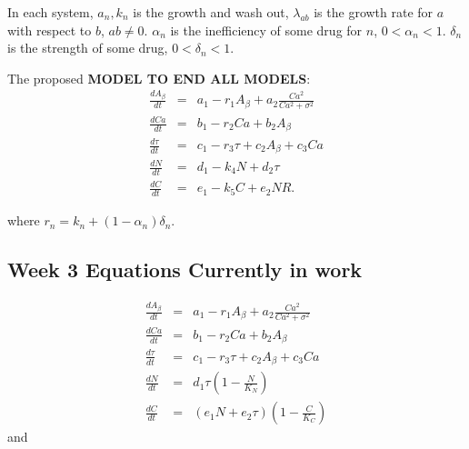 In each system, $a _{n},k _{n}$ is the growth and wash out, $\lambda _{ab}$ is the growth rate for $a$ with respect to $b$, $ab \neq 0$. 
$\alpha _{n}$ is the inefficiency of some drug for $n$, $0<\alpha _{n}<1$.
$\delta _{n}$ is the strength of some drug, $0<\delta _{n}<1$.

The proposed \textbf{MODEL TO END ALL MODELS}:
\begin{eqnarray}
    \frac{dA _{\beta}}{dt}&=&a _{1}-r _{1}A _{\beta}+a _{2}\frac{Ca ^{2}}{Ca ^{2}+\sigma ^{2}}\\
    \frac{dCa}{dt}&=& b _{1}-r _{2}Ca+b _{2}A _{\beta}\\
    \frac{d \tau}{dt}&=&c _{1}-r _{3}\tau+c _{2}A _{\beta}+c _{3}Ca\\
    \frac{dN}{dt}&=&d _{1}-k _{4}N+d _{2}\tau\\
    \frac{dC}{dt}&=&e _{1}-k _{5}C+e _{2}NR.
\end{eqnarray}

where $r _{n}= k _{n}+(1-\alpha _{n})\delta _{n}$. 
\subsection{Week 3 Equations Currently in work}
\begin{eqnarray}
    \frac{dA _{\beta}}{dt}&=&a _{1}-r _{1}A _{\beta}+a _{2}\frac{Ca ^{2}}{Ca ^{2}+\sigma ^{2}}\\
    \frac{dCa}{dt}&=& b _{1}-r _{2}Ca+b _{2}A _{\beta}\\
    \frac{d \tau}{dt}&=&c _{1}-r _{3}\tau+c _{2}A _{\beta}+c _{3}Ca\\
    \frac{dN}{dt} &=& d _{1}\tau \left(1 - \frac{N}{K _{N}}\right)\\
    \frac{dC}{dt} &=& (e _{1}N+e _{2}\tau)\left(1 - \frac{C}{K _{C}}\right)
\end{eqnarray}
and

